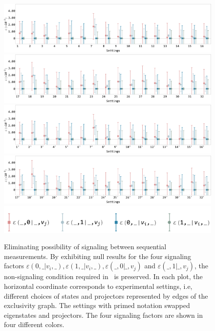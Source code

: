 \documentclass[pra,aps,notitlepage,superscriptaddress,showpacs,showkeys]{revtex4-1}
\theoremstyle{definition}
\theoremstyle{remark}
\begin{document}
 \begin{figure}[b]
     \centering
     \includegraphics[width = .97 \columnwidth]{fig/exp-res-ns/1.pdf}
     \includegraphics[width = .97 \columnwidth]{fig/exp-res-ns/2.pdf}
     \includegraphics[width = .97 \columnwidth]{fig/exp-res-ns/3.pdf}
     \includegraphics[width = .97 \columnwidth]{fig/exp-res-ns/4.pdf}
     \includegraphics[width = .67 \columnwidth]{fig/exp-res-ns/0.pdf}
     \caption{Eliminating possibility of signaling between sequential measurements. By exhibiting null results for the four signaling factors $\varepsilon(0, \_|v_i, \_), \varepsilon(1, \_|v_i, \_), \varepsilon(\_, 0|\_, v_j)$ and $\varepsilon(\_, 1|\_, v_j)$, the non-signaling condition required in~\cite{cabello16s} is preserved. In each plot, the horizontal coordinate corresponds to experimental settings, i.e, different choices of states and projectors represented by edges of the exclusivity graph. The settings with primed notation swapped eigenstates and projectors. The four signaling factors are shown in four different colors.}
     \label{fig:exp-res-0}
 \end{figure}
\end{document}
